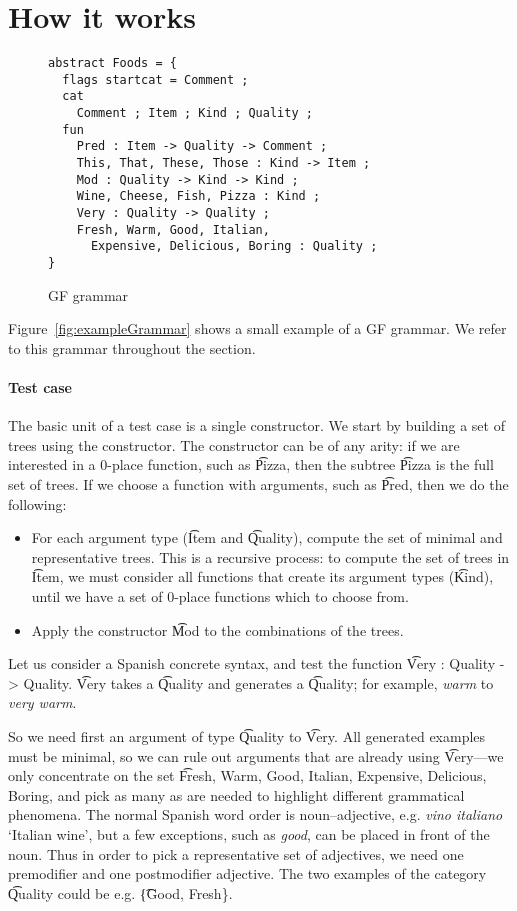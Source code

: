 \section{How it works}


\begin{figure}[h]
  \caption{GF grammar}
  \centering
    \begin{verbatim}
abstract Foods = {
  flags startcat = Comment ;
  cat
    Comment ; Item ; Kind ; Quality ;
  fun
    Pred : Item -> Quality -> Comment ;
    This, That, These, Those : Kind -> Item ;
    Mod : Quality -> Kind -> Kind ;
    Wine, Cheese, Fish, Pizza : Kind ;
    Very : Quality -> Quality ;
    Fresh, Warm, Good, Italian, 
      Expensive, Delicious, Boring : Quality ;
}
    \end{verbatim}
\end{figure}

Figure~\ref{fig:exampleGrammar} shows a small example of a GF grammar. We refer to this grammar throughout the section.

\paragraph{Test case} 
The basic unit of a test case is a single constructor. 
We start by building a set of trees using the constructor.
The constructor can be of any arity: if we are interested in a 0-place function, such as \t{Pizza}, then the subtree \t{Pizza} is the full set of trees. If we choose a function with arguments, such as \t{Pred}, then we do the following:
\begin{itemize}
\item For each argument type (\t{Item} and \t{Quality}), compute the set of minimal and representative trees. This is a recursive process: to compute the set of trees in \t{Item}, we must consider all functions that create its argument types (\t{Kind}), until we have a set of 0-place functions which to choose from.
\item Apply the constructor \t{Mod} to the combinations of the trees.
\end{itemize}

Let us consider a Spanish concrete syntax, and test the function \t{Very : Quality -> Quality}.
\t{Very} takes a \t{Quality} and generates a \t{Quality}; for example, \emph{warm} to \emph{very warm}.

So we need first an argument of type \t{Quality} to \t{Very}. All generated examples must be minimal, so we can rule out arguments that are already using \t{Very}---we only concentrate on the set \t{Fresh, Warm, Good, Italian, Expensive, Delicious, Boring}, and pick as many as are needed to highlight different grammatical phenomena.
The normal Spanish word order is noun--adjective, e.g. \emph{vino italiano} `Italian wine', but a few exceptions, such as \emph{good}, can be placed in front of the noun. Thus in order to pick a representative set of adjectives, we need one premodifier and one postmodifier adjective. The two examples of the category \t{Quality} could be e.g. \t{\{Good, Fresh\}}.

